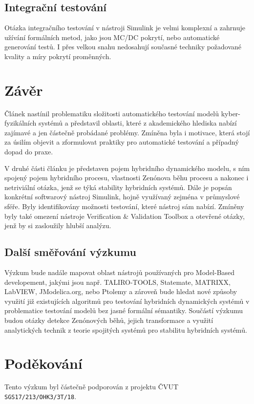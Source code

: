 \documentclass[conference,a4paper]{IEEEtran-CZ}
\begin{document}
\subsection{Integrační testování}

Otázka integračního testování v nástroji Simulink je velmi komplexní a zahrnuje užívání formálních metod, jako jsou
MC/DC pokrytí, nebo automatické generování testů. I přes velkou snahu nedosahují současné
techniky požadované kvality a míry pokrytí proměnných.

\section{Závěr}

Článek nastínil problematiku složitosti automatického testování modelů kyber-fyzikálních systémů
a představil oblasti, které z akademického hlediska nabízí zajímavé a jen částečně 
probádané problémy.  Zmíněna byla i motivace, která stojí za úsilím 
objevit a zformulovat praktiky pro automatické testování a případný dopad do praxe.

V druhé části článku je představen pojem hybridního dynamického modelu, s ním spojený
pojem hybridního procesu, vlastnosti Zenónova běhu procesu a nakonec i netriviální otázka, 
jenž se týká stability hybridních systémů. Dále je popsán konkrétní softwarový nástroj Simulink,
hojně využívaný zejména v průmyslové sféře. Byly identifikovány možnosti testování,
které nástroj sám nabízí. Zmíněny byly také omezení nástroje Verification \& Validation Toolbox 
a otevřené otázky, jenž by si zasloužily hlubší analýzu.

\subsection{Další směřování výzkumu}

Výzkum bude nadále mapovat oblast nástrojů používaných pro Model-Based developement, 
jakými jsou např. TALIRO-TOOLS, Statemate, MATRIXX, LabVIEW, JModelica.org, 
nebo Ptolemy a zároveň bude hledat nové způsoby využití již existujících algoritmů 
pro testování hybridních dynamických systémů v problematice testování modelů bez jasné formální
sémantiky. Součástí výzkumu budou otázky detekce Zenónových běhů, jejich transformace
a využití analytických technik z teorie spojitých systémů pro stabilitu hybridních systémů.

\section*{Poděkování}

Tento výzkum byl částečně podporován z projektu ČVUT
\texttt{SGS17/213/OHK3/3T/18}.


\def\refname{Literatura}


\vspace{0cm}
\end{document}
